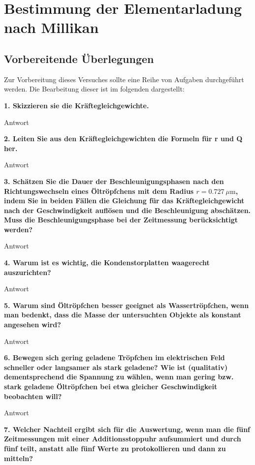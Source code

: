 \section{Bestimmung der Elementarladung nach Millikan} 


\subsection{Vorbereitende Überlegungen}

Zur Vorbereitung dieses Versuches sollte eine Reihe von Aufgaben durchgeführt werden. 
Die Bearbeitung dieser ist im folgenden dargestellt:
\vspace{0,5cm}

\noindent \textbf{1. Skizzieren sie die Kräftegleichgewichte.}

	Antwort

\noindent \textbf{2. Leiten Sie aus den Kräftegleichgewichten die Formeln für r und Q her.}

	Antwort

\noindent \textbf{3. Schätzen Sie die Dauer der Beschleunigungsphasen nach den Richtungswechseln eines Öltröpfchens mit dem Radius $r = \SI{0,727}{\mu\m}$, indem Sie in beiden Fällen die Gleichung für das Kräftegleichgewicht nach der Geschwindigkeit auflösen und die Beschleunigung abschätzen. Muss die Beschleunigungsphase bei der Zeitmessung berücksichtigt werden?}

	Antwort

\noindent \textbf{4. Warum ist es wichtig, die Kondenstorplatten waagerecht auszurichten?}

	Antwort

\noindent \textbf{5. Warum sind Öltröpfchen besser geeignet als Wassertröpfchen, wenn man bedenkt, dass die Masse der untersuchten Objekte als konstant angesehen wird?}

	Antwort

\noindent \textbf{6. Bewegen sich gering geladene Tröpfchen im elektrischen Feld schneller oder langsamer als stark geladene? Wie ist (qualitativ) dementsprechend die Spannung zu wählen, wenn man gering bzw. stark geladene Öltröpfchen bei etwa gleicher Geschwindigkeit beobachten will?}

	Antwort

\noindent \textbf{7. Welcher Nachteil ergibt sich für die Auswertung, wenn man die fünf Zeitmessungen mit einer Additionsstoppuhr aufsummiert und durch fünf teilt, anstatt alle fünf Werte zu protokollieren und dann zu mitteln?}

